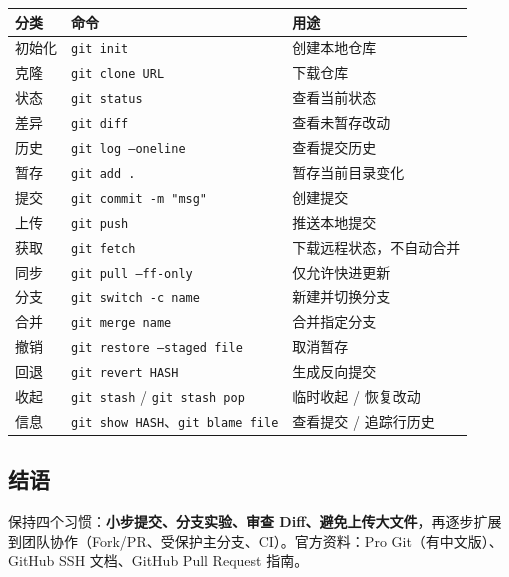 \documentclass[12pt,a4paper]{ctexart}
\begin{document}
	\begin{tabularx}{\linewidth}{l l X}
		\toprule
		\textbf{分类} & \textbf{命令} & \textbf{用途} \\
		\midrule
		初始化 & \texttt{git init} & 创建本地仓库 \\
		克隆 & \texttt{git clone URL} & 下载仓库 \\
		状态 & \texttt{git status} & 查看当前状态 \\
		差异 & \texttt{git diff} & 查看未暂存改动 \\
		历史 & \texttt{git log --oneline} & 查看提交历史 \\
		暂存 & \texttt{git add .} & 暂存当前目录变化 \\
		提交 & \texttt{git commit -m "msg"} & 创建提交 \\
		上传 & \texttt{git push} & 推送本地提交 \\
		获取 & \texttt{git fetch} & 下载远程状态，不自动合并 \\
		同步 & \texttt{git pull --ff-only} & 仅允许快进更新 \\
		分支 & \texttt{git switch -c name} & 新建并切换分支 \\
		合并 & \texttt{git merge name} & 合并指定分支 \\
		撤销 & \texttt{git restore --staged file} & 取消暂存 \\
		回退 & \texttt{git revert HASH} & 生成反向提交 \\
		收起 & \texttt{git stash} / \texttt{git stash pop} & 临时收起 / 恢复改动 \\
		信息 & \texttt{git show HASH}、\texttt{git blame file} & 查看提交 / 追踪行历史 \\
		\bottomrule
	\end{tabularx}

	\subsection*{结语}

	保持四个习惯：\textbf{小步提交、分支实验、审查 Diff、避免上传大文件}，再逐步扩展到团队协作（Fork/PR、受保护主分支、CI）。官方资料：Pro Git（有中文版）、GitHub SSH 文档、GitHub Pull Request 指南。
\end{document}
